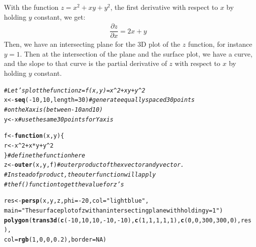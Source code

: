 \documentclass[conference,final,11pt,technote,onecolumn]{IEEEtran}\usepackage[]{graphicx}\usepackage[]{color}
\makeatletter
\newcommand{\hlnum}[1]{\textcolor[rgb]{0.686,0.059,0.569}{#1}}%
\newcommand{\hlstr}[1]{\textcolor[rgb]{0.192,0.494,0.8}{#1}}%
\newcommand{\hlcom}[1]{\textcolor[rgb]{0.678,0.584,0.686}{\textit{#1}}}%
\newcommand{\hlopt}[1]{\textcolor[rgb]{0,0,0}{#1}}%
\newcommand{\hlstd}[1]{\textcolor[rgb]{0.345,0.345,0.345}{#1}}%
\newcommand{\hlkwa}[1]{\textcolor[rgb]{0.161,0.373,0.58}{\textbf{#1}}}%
\newcommand{\hlkwb}[1]{\textcolor[rgb]{0.69,0.353,0.396}{#1}}%
\newcommand{\hlkwc}[1]{\textcolor[rgb]{0.333,0.667,0.333}{#1}}%
\newcommand{\hlkwd}[1]{\textcolor[rgb]{0.737,0.353,0.396}{\textbf{#1}}}%
\newenvironment{kframe}{%
 \def\at@end@of@kframe{}%
 \ifinner\ifhmode%
  \def\at@end@of@kframe{\end{minipage}}%
  \begin{minipage}{\columnwidth}%
 \fi\fi%
 \def\FrameCommand##1{\hskip\@totalleftmargin \hskip-\fboxsep
 \colorbox{shadecolor}{##1}\hskip-\fboxsep
     \hskip-\linewidth \hskip-\@totalleftmargin \hskip\columnwidth}%
 \MakeFramed {\advance\hsize-\width
   \@totalleftmargin\z@ \linewidth\hsize
   \@setminipage}}%
 {\par\unskip\endMakeFramed%
 \at@end@of@kframe}
\newenvironment{knitrout}{}{} %
\makeatother
\begin{document}
With the function $z=x^2+xy+y^2$, the first derivative with respect to $x$ by holding $y$ constant, we get:
\begin{eqnarray}
\nonumber \dfrac{\partial z}{\partial x} = 2x+y
\end{eqnarray}
Then, we have an intersecting plane for the 3D plot of the $z$ function, for instance $y=1$. Then at the intersection of the plane and the surface plot, we have a curve, and the slope to that curve is the partial derivative of $z$ with respect to $x$ by holding $y$ constant.
\begin{knitrout}
\color{fgcolor}\begin{kframe}
\begin{alltt}
\hlcom{#Let's plot the function z = f(x,y) = x^2 + xy + y^2}
\hlstd{x} \hlkwb{<-} \hlkwd{seq}\hlstd{(}\hlopt{-}\hlnum{10}\hlstd{,}\hlnum{10}\hlstd{,}\hlkwc{length}\hlstd{=}\hlnum{30}\hlstd{)} \hlcom{#generate equally spaced 30 points }
                \hlcom{#on the X axis (between -10 and 10)}
\hlstd{y} \hlkwb{<-} \hlstd{x} \hlcom{#use the same 30 points for Y axis}

\hlstd{f} \hlkwb{<-} \hlkwa{function}\hlstd{(}\hlkwc{x}\hlstd{,}\hlkwc{y}\hlstd{)\{}
        \hlstd{r} \hlkwb{<-} \hlstd{x}\hlopt{^}\hlnum{2}\hlopt{+}\hlstd{x}\hlopt{*}\hlstd{y}\hlopt{+}\hlstd{y}\hlopt{^}\hlnum{2}
\hlstd{\}} \hlcom{#define the function here}
\hlstd{z} \hlkwb{<-} \hlkwd{outer}\hlstd{(x,y,f)} \hlcom{#outer product of the x vector and y vector. }
                \hlcom{#Instead of product, the outer function will apply }
                \hlcom{#the f() function to get the value for z's}

\hlstd{res} \hlkwb{<-} \hlkwd{persp}\hlstd{(x,y,z,}\hlkwc{phi}\hlstd{=}\hlopt{-}\hlnum{20}\hlstd{,}\hlkwc{col}\hlstd{=}\hlstr{"lightblue"}\hlstd{,}
        \hlkwc{main}\hlstd{=}\hlstr{"The surface plot of z with an intersecting plane with holding y=1"}\hlstd{)}
\hlkwd{polygon}\hlstd{(}\hlkwd{trans3d}\hlstd{(}\hlkwd{c}\hlstd{(}\hlopt{-}\hlnum{10}\hlstd{,}\hlnum{10}\hlstd{,}\hlnum{10}\hlstd{,}\hlopt{-}\hlnum{10}\hlstd{,}\hlopt{-}\hlnum{10}\hlstd{),} \hlkwd{c}\hlstd{(}\hlnum{1}\hlstd{,}\hlnum{1}\hlstd{,}\hlnum{1}\hlstd{,}\hlnum{1}\hlstd{,}\hlnum{1}\hlstd{),}\hlkwd{c}\hlstd{(}\hlnum{0}\hlstd{,}\hlnum{0}\hlstd{,}\hlnum{300}\hlstd{,}\hlnum{300}\hlstd{,}\hlnum{0}\hlstd{),res),}
                        \hlkwc{col}\hlstd{=}\hlkwd{rgb}\hlstd{(}\hlnum{1}\hlstd{,}\hlnum{0}\hlstd{,}\hlnum{0}\hlstd{,}\hlnum{0.2}\hlstd{),}\hlkwc{border}\hlstd{=}\hlnum{NA}\hlstd{)}
\end{alltt}
\end{kframe}


\end{knitrout}
\end{document}
